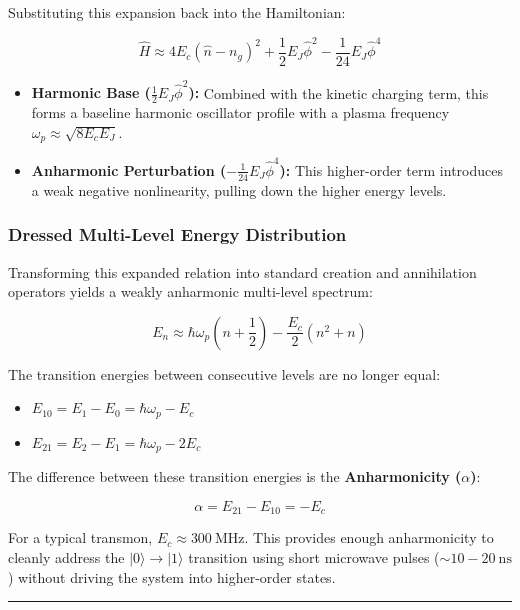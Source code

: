 \documentclass[
]{article}
\providecommand{\tightlist}{%
  \setlength{\itemsep}{0pt}\setlength{\parskip}{0pt}}
\begin{document}
Substituting this expansion back into the Hamiltonian:

\[\hat{H} \approx 4 E_c (\hat{n} - n_g)^2 + \frac{1}{2} E_J \hat{\phi}^2 - \frac{1}{24} E_J \hat{\phi}^4\]

\begin{itemize}
\tightlist
\item
  \textbf{Harmonic Base (\(\frac{1}{2} E_J \hat{\phi}^2\)):} Combined
  with the kinetic charging term, this forms a baseline harmonic
  oscillator profile with a plasma frequency
  \(\omega_p \approx \sqrt{8 E_c E_J}\).
\item
  \textbf{Anharmonic Perturbation (\(-\frac{1}{24} E_J \hat{\phi}^4\)):}
  This higher-order term introduces a weak negative nonlinearity,
  pulling down the higher energy levels.
\end{itemize}

\subsubsection{Dressed Multi-Level Energy
Distribution}\label{dressed-multi-level-energy-distribution}

Transforming this expanded relation into standard creation and
annihilation operators yields a weakly anharmonic multi-level spectrum:

\[E_n \approx \hbar \omega_p \left(n + \frac{1}{2}\right) - \frac{E_c}{2} \left(n^2 + n\right)\]

The transition energies between consecutive levels are no longer equal:

\begin{itemize}
\tightlist
\item
  \(E_{10} = E_1 - E_0 = \hbar \omega_p - E_c\)
\item
  \(E_{21} = E_2 - E_1 = \hbar \omega_p - 2E_c\)
\end{itemize}

The difference between these transition energies is the
\textbf{Anharmonicity (\(\alpha\))}:

\[\alpha = E_{21} - E_{10} = -E_c\]

For a typical transmon, \(E_c \approx 300\ \text{MHz}\). This provides
enough anharmonicity to cleanly address the \(|0\rangle \to |1\rangle\)
transition using short microwave pulses (\(\sim 10 - 20\ \text{ns}\))
without driving the system into higher-order states.

\begin{center}\rule{0.5\linewidth}{0.5pt}\end{center}
\end{document}
